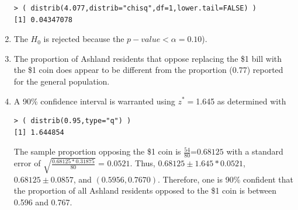 \documentclass[10pt,openany]{book}\usepackage[]{graphicx}\usepackage[]{color}
\makeatletter
\newenvironment{kframe}{%
 \def\at@end@of@kframe{}%
 \ifinner\ifhmode%
  \def\at@end@of@kframe{\end{minipage}}%
  \begin{minipage}{\columnwidth}%
 \fi\fi%
 \def\FrameCommand##1{\hskip\@totalleftmargin \hskip-\fboxsep
 \colorbox{shadecolor}{##1}\hskip-\fboxsep
     \hskip-\linewidth \hskip-\@totalleftmargin \hskip\columnwidth}%
 \MakeFramed {\advance\hsize-\width
   \@totalleftmargin\z@ \linewidth\hsize
   \@setminipage}}%
 {\par\unskip\endMakeFramed%
 \at@end@of@kframe}
\newenvironment{knitrout}{}{} %
\makeatother
\begin{document}
\begin{enumerate}
\begin{knitrout}
\color{fgcolor}\begin{kframe}
\begin{verbatim}
> ( distrib(4.077,distrib="chisq",df=1,lower.tail=FALSE) )
[1] 0.04347078
\end{verbatim}
\end{kframe}
\end{knitrout}
    \item The $H_{0}$ is rejected because the $p-value <\alpha=0.10$).
    \item The proportion of Ashland residents that oppose replacing the \$1 bill with the \$1 coin does appear to be different from the proportion (0.77) reported for the general population.
    \item A 90\% confidence interval is warranted using $z^{*}=$1.645 as determined with
\begin{knitrout}
\color{fgcolor}\begin{kframe}
\begin{verbatim}
> ( distrib(0.95,type="q") )
[1] 1.644854
\end{verbatim}
\end{kframe}
\end{knitrout}
The sample proportion opposing the \$1 coin is $\frac{54}{80}$=$0.68125$ with a standard error of $\sqrt{\frac{0.68125*0.31875}{80}}$ = $0.0521$.  Thus, $0.68125\pm1.645*0.0521$, $0.68125\pm0.0857$, and $(0.5956,0.7670)$.  Therefore, one is 90\% confident that the proportion of all Ashland residents opposed to the \$1 coin is between 0.596 and 0.767.
\end{enumerate}
\end{document}
